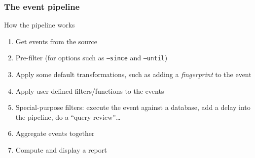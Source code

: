 \begin{frame}
   \frametitle{The event pipeline}
   \begin{block}{How the pipeline works}
   \begin{enumerate}
      \item Get events from the source
      \item Pre-filter (for options such as \texttt{--since} and \texttt{--until})
      \item Apply some default transformations, such as adding a \emph{fingerprint} to the event
      \item Apply user-defined filters/functions to the events
      \item Special-purpose filters: execute the event against a database, add a delay into the pipeline, do a ``query review''\dots
      \item Aggregate events together
      \item Compute and display a report
   \end{enumerate}
   \end{block}


\end{frame}
